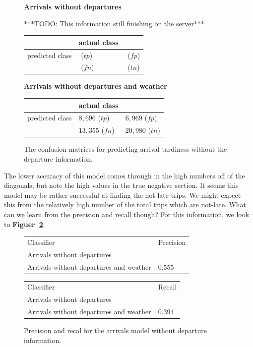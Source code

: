 \documentclass[11pt]{article} %
\begin{document}
\begin{figure}
    \textbf{Arrivals without departures}

    ***TODO: This information still finishing on the server***

    \begin{tabular}[h]{l|ll}
                         & actual class &  \\
         \hline
         predicted class & $ $ ($tp$)& $ $ ($fp$)\\
                         & $ $ ($fn$)& $ $ ($tn$)\\
    \end{tabular}

    \textbf{Arrivals without departures and weather}

    \begin{tabular}[h]{l|ll}
                         & actual class &  \\
         \hline
         predicted class & $8,696$ ($tp$)& $6,969$ ($fp$)\\
                         & $13,355$ ($fn$)& $20,980$ ($tn$)\\
    \end{tabular}
    \caption{The confusion matrices for predicting arrival tardiness without
    the departure information.}
    \label{fig:confusion_arrivals_nod}
\end{figure}

The lower accuracy of this model comes through in the high numbers off of the 
diagonals, but note the high values in the true negative section. It seems this
model may be rather successful at finding the not-late trips. We might expect 
this from the relatively high number of the total trips which are not-late. 
What can we learn from the precision and recall though? For this information,
we look to \textbf{Figuer~\ref{fig:pr_arrivals_nod}}.

\begin{figure}
    \begin{tabular}{ll}
         Classifier & Precision\\
         Arrivals without departures & \\
         Arrivals without departures and weather & 0.555\\
    \end{tabular}
    
    \begin{tabular}{ll}
         Classifier & Recall\\
         Arrivals without departures & \\
         Arrivals without departures and weather& 0.394\\
    \end{tabular}
    \caption{Precision and recal for the arrivals model without departure 
    information.}
    \label{fig:pr_arrivals_nod}
\end{figure}
\end{document}
